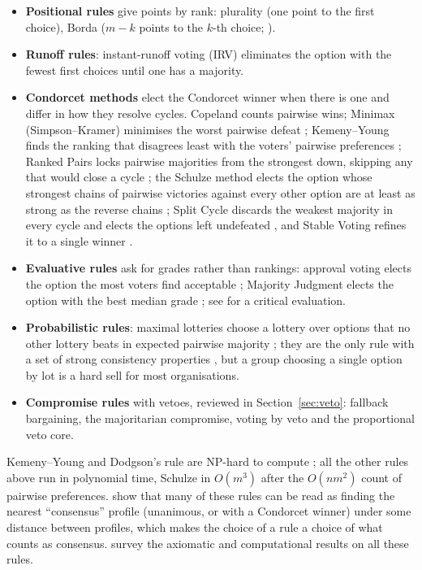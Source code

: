 \begin{itemize}
  \item \textbf{Positional rules} give points by rank: plurality (one point to the first choice), Borda
  ($m-k$ points to the $k$-th choice; \citealp{Young1974}).
  \item \textbf{Runoff rules}: instant-runoff voting (IRV) eliminates the option with the fewest first
  choices until one has a majority.
  \item \textbf{Condorcet methods} elect the Condorcet winner when there is one and differ in how they
  resolve cycles. Copeland counts pairwise wins; Minimax (Simpson--Kramer) minimises the worst pairwise
  defeat \citep{Simpson1969}; Kemeny--Young finds the ranking that disagrees least with the voters'
  pairwise preferences \citep{Kemeny1959,YoungLevenglick1978}; Ranked Pairs locks pairwise majorities
  from the strongest down, skipping any that would close a cycle \citep{Tideman1987}; the Schulze method
  elects the option whose strongest chains of pairwise victories against every other option are at
  least as strong as the reverse chains \citep{Schulze2011}; Split Cycle discards the weakest majority in
  every cycle and elects the options left undefeated \citep{HollidayPacuit2023splitcycle}, and Stable
  Voting refines it to a single winner \citep{HollidayPacuit2023stable}.
  \item \textbf{Evaluative rules} ask for grades rather than rankings: approval voting elects the option
  the most voters find acceptable \citep{BramsFishburn1978,LaslierSanver2010}; Majority Judgment elects
  the option with the best median grade \citep{BalinskiLaraki2007,BalinskiLaraki2011}; see
  \citet{FelsenthalMachover2008} for a critical evaluation.
  \item \textbf{Probabilistic rules}: maximal lotteries choose a lottery over options that no other
  lottery beats in expected pairwise majority \citep{Fishburn1984,LaffondLaslierLeBreton1993}; they are
  the only rule with a set of strong consistency properties \citep{BrandlBrandtSeedig2016}, but a group
  choosing a single option by lot is a hard sell for most organisations.
  \item \textbf{Compromise rules} with vetoes, reviewed in Section~\ref{sec:veto}: fallback bargaining,
  the majoritarian compromise, voting by veto and the proportional veto core.
\end{itemize}
Kemeny--Young and Dodgson's rule are NP-hard to compute \citep{BartholdiToveyTrick1989hard}; all the
other rules above run in polynomial time, Schulze in $O(m^3)$ after the $O(nm^2)$ count of pairwise
preferences. \citet{ElkindFaliszewskiSlinko2015} show that many of these rules can be read as finding the
nearest ``consensus'' profile (unanimous, or with a Condorcet winner) under some distance between
profiles, which makes the choice of a rule a choice of what counts as consensus. \citet{BrandtEtAl2016handbook}
survey the axiomatic and computational results on all these rules.

